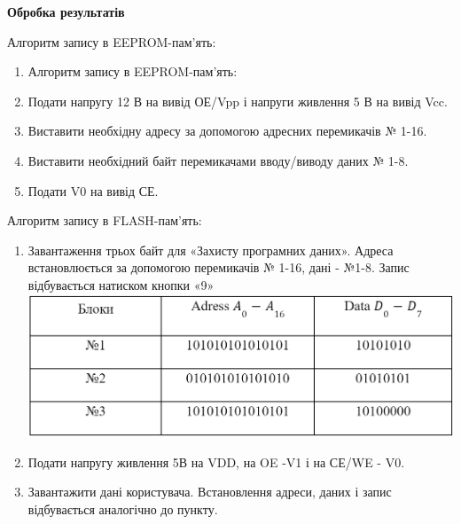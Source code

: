 \documentclass[a4paper,14pt]{extreport}
\begin{document}
\begin{figure}[h!]
	\label{ris1}
\end{figure}

\newpage

\begin{center}
\textbf{Обробка результатів}
\end{center}
Алгоритм запису в EEPROM-пам’ять:\\ 

\begin{enumerate}
\item Алгоритм запису в EEPROM-пам’ять:
\item Подати напругу 12 В на вивід ОЕ/Vpp  і напруги живлення 5 В на вивід Vcc. 
\item Виставити необхідну адресу за допомогою адресних перемикачів № 1-16.
\item Виставити необхідний байт перемикачами вводу/виводу даних № 1-8.
\item Подати V0 на вивід СЕ.
\end{enumerate}

Алгоритм запису в FLASH-пам’ять: \\ 

\begin{enumerate}
\item Завантаження трьох байт для «Захисту програмних даних». Адреса встановлюється за допомогою перемикачів № 1-16, дані - №1-8. Запис відбувається натиском кнопки «9»\\
\includegraphics[width=0.5\linewidth]{2.png}
\item Подати напругу живлення 5В на VDD, на OE -V1 і на СЕ/WE - V0.

\item Завантажити дані користувача. Встановлення адреси, даних і запис відбувається аналогічно до пункту.

\end{enumerate}
\end{document}
